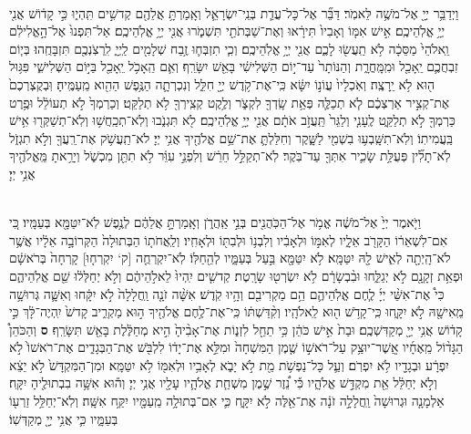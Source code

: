 \documentclass[twoside, openany, parskip=half, 11pt]{book}
\begin{document}
\begin{footnotesize}
\begin{multicols}{2}
\\
 וַיְדַבֵּ֥ר יְיָ֖ אֶל־מֹשֶׁ֥ה לֵּאמֹֽר׃ דַּבֵּ֞ר אֶל־כָּל־עֲדַ֧ת בְּנֵֽי־יִשְׂרָאֵ֛ל וְאָֽמַרְתָּ֥ אֲלֵהֶ֖ם קְדשִׁ֣ים תִּֽהְי֑וּ כִּ֣י קָד֔וֹשׁ אֲנִ֖י יְיָ֥ אֱלֹֽהֵיכֶֽם׃ אִ֣ישׁ אִמּ֤וֹ וְאָבִיו֙ תִּירָ֔אוּ וְאֶת־שַׁבְּתֹתַ֖י תִּשְׁמֹ֑רוּ אֲנִ֖י יְיָ֥ אֱלֹֽהֵיכֶֽם׃ אַל־תִּפְנוּ֙ אֶל־הָ֣אֱלִילִ֔ם וֵֽאלֹהֵי֙ מַסֵּכָ֔ה לֹ֥א תַֽעֲשׂ֖וּ לָכֶ֑ם אֲנִ֖י יְיָ֥ אֱלֹֽהֵיכֶֽם׃  וְכִ֧י תִזְבְּח֛וּ זֶ֥בַח שְׁלָמִ֖ים לַֽיְיָ֑ לִֽרְצֹֽנְכֶ֖ם תִּזְבָּחֻֽהוּ׃ בְּי֧וֹם זִבְחֲכֶ֛ם יֵֽאָכֵ֖ל וּמִֽמָּֽחֳרָ֑ת וְהַנּוֹתָר֙ עַד־י֣וֹם הַשְּׁלִישִׁ֔י בָּאֵ֖שׁ יִשָּׂרֵֽף׃ וְאִ֛ם הֵֽאָכֹ֥ל יֵֽאָכֵ֖ל בַּיּ֣וֹם הַשְּׁלִישִׁ֑י פִּגּ֥וּל ה֖וּא לֹ֥א יֵֽרָצֶֽה׃ וְאֹֽכְלָיו֙ עֲוֹנ֣וֹ יִשָּׂ֔א כִּֽי־אֶת־קֹ֥דֶשׁ יְיָ֖ חִלֵּ֑ל וְנִכְרְתָ֛ה הַנֶּ֥פֶשׁ הַהִ֖וא מֵֽעַמֶּֽיהָ׃ וּֽבְקֻצְרְכֶם֙ אֶת־קְצִ֣יר אַרְצְכֶ֔ם לֹ֧א תְכַלֶּ֛ה פְּאַ֥ת שָֽׂדְךָ֖ לִקְצֹ֑ר וְלֶ֥קֶט קְצִֽירְךָ֖ לֹ֥א תְלַקֵּֽט׃ וְכַרְמְךָ֙ לֹ֣א תְעוֹלֵ֔ל וּפֶ֥רֶט כַּרְמְךָ֖ לֹ֣א תְלַקֵּ֑ט לֶֽעָנִ֤י וְלַגֵּר֙ תַּֽעֲזֹ֣ב אֹתָ֔ם אֲנִ֖י יְיָ֥ אֱלֹֽהֵיכֶֽם׃  לֹ֖א תִּגְנֹ֑בוּ וְלֹֽא־תְכַֽחֲשׁ֥וּ וְלֹֽא־תְשַׁקְּר֖וּ אִ֥ישׁ בַּֽעֲמִיתֽוֹ׃ וְלֹֽא־תִשָּֽׁבְע֥וּ בִשְׁמִ֖י לַשָּׁ֑קֶר וְחִלַּלְתָּ֛ אֶת־שֵׁ֥ם אֱלֹהֶ֖יךָ אֲנִ֥י יְיָ׃ לֹא־תַֽעֲשֹׁ֥ק אֶת־רֵֽעֲךָ֖ וְלֹ֣א תִגְזֹ֑ל לֹֽא־תָלִ֞ין פְּעֻלַּ֥ת שָׂכִ֛יר אִתְּךָ֖ עַד־בֹּֽקֶר׃ לֹֽא־תְקַלֵּ֣ל חֵרֵ֔שׁ וְלִפְנֵ֣י עִוֵּ֔ר לֹ֥א תִתֵּ֖ן מִכְשֹׁ֑ל וְיָרֵ֥אתָ מֵּֽאֱלֹהֶ֖יךָ אֲנִ֥י יְיָ׃

\\
 וַיֹּ֤אמֶר יְיָ֙ אֶל־מֹשֶׁ֔ה אֱמֹ֥ר אֶל־הַכֹּֽהֲנִ֖ים בְּנֵ֣י אַֽהֲרֹ֑ן וְאָֽמַרְתָּ֣ אֲלֵהֶ֔ם לְנֶ֥פֶשׁ לֹֽא־יִטַּמָּ֖א בְּעַמָּֽיו׃ כִּ֚י אִם־לִשְׁאֵר֔וֹ הַקָּרֹ֖ב אֵלָ֑יו לְאִמּ֣וֹ וּלְאָבִ֔יו וְלִבְנ֥וֹ וּלְבִתּ֖וֹ וּלְאָחִֽיו׃ וְלַֽאֲחֹת֤וֹ הַבְּתוּלָה֙ הַקְּרוֹבָ֣ה אֵלָ֔יו אֲשֶׁ֥ר לֹא־הָֽיְתָ֖ה לְאִ֑ישׁ לָ֖הּ יִטַּמָּֽא׃ לֹ֥א יִטַּמָּ֖א בַּ֣עַל בְּעַמָּ֑יו לְהֵ֖חַלּֽוֹ׃ לֹֽא־יִקְרְחֻ֤ה [ק‘ יִקְרְח֤וּ] קָרְחָה֙ בְּרֹאשָׁ֔ם וּפְאַ֥ת זְקָנָ֖ם לֹ֣א יְגַלֵּ֑חוּ וּבִ֨בְשָׂרָ֔ם לֹ֥א יִשְׂרְט֖וּ שָׂרָֽטֶת׃ קְדשִׁ֤ים יִֽהְיוּ֙ לֵאלֹ֣הֵיהֶ֔ם וְלֹ֣א יְחַלְּל֔וּ שֵׁ֖ם אֱלֹֽהֵיהֶ֑ם כִּי֩ אֶת־אִשֵּׁ֨י יְיָ֜ לֶ֧חֶם אֱלֹֽהֵיהֶ֛ם הֵ֥ם מַקְרִיבִ֖ם וְהָ֥יוּ קֹֽדֶשׁ׃  אִשָּׁ֨ה זֹנָ֤ה וַֽחֲלָלָה֙ לֹ֣א יִקָּ֔חוּ וְאִשָּׁ֛ה גְּרוּשָׁ֥ה מֵֽאִישָׁ֖הּ לֹ֣א יִקָּ֑חוּ כִּֽי־קָדֹ֥שׁ ה֖וּא לֵֽאלֹהָֽיו׃ וְקִ֨דַּשְׁתּ֔וֹ כִּֽי־אֶת־לֶ֥חֶם אֱלֹהֶ֖יךָ ה֣וּא מַקְרִ֑יב קָדשׁ֙ יִֽהְיֶה־לָּ֔ךְ כִּ֣י קָד֔וֹשׁ אֲנִ֥י יְיָ֖ מְקַדִּשְׁכֶֽם׃ וּבַת֙ אִ֣ישׁ כֹּהֵ֔ן כִּ֥י תֵחֵ֖ל לִזְנ֑וֹת אֶת־אָבִ֨יהָ֙ הִ֣יא מְחַלֶּ֔לֶת בָּאֵ֖שׁ תִּשָּׂרֵֽף׃ \textbf{ס} וְהַכֹּהֵן֩ הַגָּד֨וֹל מֵֽאֶחָ֜יו אֲֽשֶׁר־יוּצַ֥ק עַל־רֹאשׁ֣וֹ שֶׁ֤מֶן הַמִּשְׁחָה֙ וּמִלֵּ֣א אֶת־יָד֔וֹ לִלְבֹּ֖שׁ אֶת־הַבְּגָדִ֑ים אֶת־רֹאשׁוֹ֙ לֹ֣א יִפְרָ֔ע וּבְגָדָ֖יו לֹ֥א יִפְרֹֽם׃ וְעַ֛ל כָּל־נַפְשֹׁ֥ת מֵ֖ת לֹ֣א יָבֹ֑א לְאָבִ֥יו וּלְאִמּ֖וֹ לֹ֥א יִטַּמָּֽא׃ וּמִן־הַמִּקְדָּשׁ֙ לֹ֣א יֵצֵ֔א וְלֹ֣א יְחַלֵּ֔ל אֵ֖ת מִקְדַּ֣שׁ אֱלֹהָ֑יו כִּ֡י נֵ֠זֶר שֶׁ֣מֶן מִשְׁחַ֧ת אֱלֹהָ֛יו עָלָ֖יו אֲנִ֥י יְיָ׃  וְה֕וּא אִשָּׁ֥ה בִבְתוּלֶ֖יהָ יִקָּֽח׃ אַלְמָנָ֤ה וּגְרוּשָׁה֙ וַֽחֲלָלָ֣ה זֹנָ֔ה אֶת־אֵ֖לֶּה לֹ֣א יִקָּ֑ח כִּ֛י אִם־בְּתוּלָ֥ה מֵֽעַמָּ֖יו יִקַּ֥ח אִשָּֽׁה׃ וְלֹֽא־יְחַלֵּ֥ל זַרְע֖וֹ בְּעַמָּ֑יו כִּ֛י אֲנִ֥י יְיָ֖ מְקַדְּשֽׁוֹ׃


\end{multicols}
\end{footnotesize}
\end{document}
